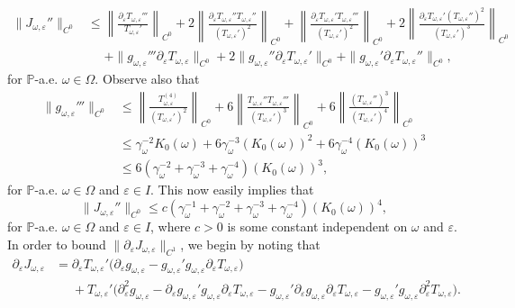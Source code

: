 \documentclass[11pt,reqno,a4paper]{article}
\theoremstyle{special}
\renewcommand{\epsilon}{\varepsilon}
\begin{document}
\[
\begin{split}
\|J_{\omega, \epsilon}''\|_{C^0} &\le \left \|\frac{\partial_\epsilon T_{\omega, \epsilon}'''}{T_{\omega, \epsilon}'}\right \|_{C^0}+2\left \|\frac{\partial_\epsilon T_{\omega, \epsilon}'' T_{\omega, \epsilon}''}{(T_{\omega, \epsilon}')^2}\right \|_{C^0}+\left \| \frac{\partial_\epsilon T_{\omega, \epsilon}' T_{\omega, \epsilon}'''}{(T_{\omega, \epsilon}')^2}\right \|_{C^0} +2\left \|\frac{\partial_\epsilon T_{\omega, \epsilon}' (T_{\omega, \epsilon}'')^2}{(T_{\omega, \epsilon}')^3}\right \|_{C^0}\\
&\phantom{\le}+\|g_{\omega, \epsilon}'''\partial_\epsilon T_{\omega, \epsilon}\|_{C^0}+2\|g_{\omega, \epsilon}''\partial_\epsilon T_{\omega, \epsilon}'\|_{C^0} +\|g_{\omega, \epsilon}'\partial_\epsilon T_{\omega, \epsilon}''\|_{C^0},
\end{split}
\]
for $\mathbb P$-a.e. $\omega \in \Omega$.
Observe also that 
\[
\begin{split}
\|g_{\omega, \epsilon}'''\|_{C^0} & \le \left \| \frac{T_{\omega, \epsilon}^{(4)}}{(T_{\omega, \epsilon}')^2}\right \|_{C^0}+6\left \|\frac{T_{\omega, \epsilon}'' T_{\omega, \epsilon}'''}{(T_{\omega, \epsilon}')^3}\right  \|_{C^0}+6\left \|\frac{(T_{\omega, \epsilon}'')^3}{(T_{\omega, \epsilon}')^4}\right \|_{C^0} \\
&\le \gamma_\omega^{-2}K_0(\omega)+6\gamma_\omega^{-3}(K_0(\omega))^2+6\gamma_\omega^{-4}(K_0(\omega))^3 \\
&\le 6(\gamma_\omega^{-2}+\gamma_\omega^{-3}+\gamma_\omega^{-4})(K_0(\omega))^3,
\end{split}
\]
for $\mathbb P$-a.e. $\omega \in \Omega$ and $\epsilon \in I$. This now easily implies that 
\[
\|J_{\omega, \epsilon}''\|_{C^0}\le c(\gamma_\omega^{-1}+\gamma_\omega^{-2}+\gamma_\omega^{-3}+\gamma_\omega^{-4})(K_0(\omega))^4,
\]
for $\mathbb P$-a.e. $\omega \in \Omega$ and $\epsilon \in I$, where $c>0$ is some constant independent on $\omega$ and $\epsilon$. In order to bound $\|\partial_\epsilon J_{\omega, \epsilon}\|_{C^1}$, we begin by noting that
	\[
	\begin{split}
		\partial_\epsilon J_{\omega,\epsilon} &=\partial_\epsilon T_{\omega, \epsilon}' \bigg (\partial_\epsilon g_{\omega, \epsilon}-g_{\omega, \epsilon}' g_{\omega, \epsilon} \partial_{\epsilon}T_{\omega, \epsilon}\bigg )\\ 
		&\phantom{=} + T_{\omega, \epsilon}'\bigg (\partial_\epsilon^2 g_{\omega, \epsilon}-\partial_\epsilon g_{\omega, \epsilon}' g_{\omega, \epsilon} \partial_{\epsilon}T_{\omega, \epsilon}-g_{\omega, \epsilon}' \partial_\epsilon g_{\omega, \epsilon} \partial_{\epsilon}T_{\omega, \epsilon}-g_{\omega, \epsilon}'   g_ {\omega, \epsilon} \partial_{\epsilon}^2 T_{\omega, \epsilon}\bigg ).
	\end{split}
	\]
\end{document}
